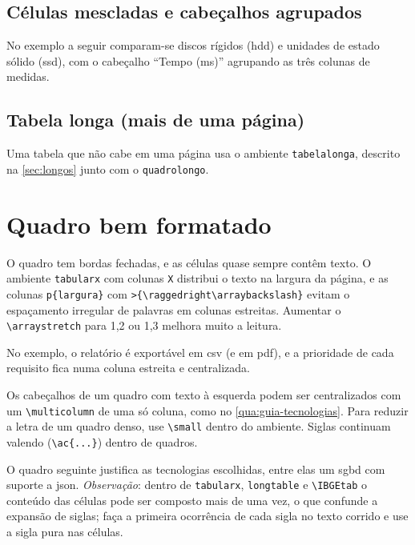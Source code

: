 \subsection{Células mescladas e cabeçalhos agrupados}

No exemplo a seguir comparam-se discos rígidos (\ac{hdd}) e unidades de estado sólido
(\ac{ssd}), com o cabeçalho ``Tempo (ms)'' agrupando as três colunas de medidas.


\subsection{Tabela longa (mais de uma página)}

Uma tabela que não cabe em uma página usa o ambiente \texttt{tabelalonga}, descrito na
\autoref{sec:longos} junto com o \texttt{quadrolongo}.

\section{Quadro bem formatado}

O quadro tem bordas fechadas, e as células quase sempre contêm texto. O ambiente
\texttt{tabularx} com colunas \texttt{X} distribui o texto na largura da página, e as
colunas \texttt{p\{largura\}} com
\texttt{>\{\textbackslash raggedright\textbackslash arraybackslash\}} evitam o
espaçamento irregular de palavras em colunas estreitas. Aumentar o
\texttt{\textbackslash arraystretch} para 1,2 ou 1,3 melhora muito a leitura.

No exemplo, o relatório é exportável em \ac{csv} (e em \ac{pdf}), e a prioridade de cada
requisito fica numa coluna estreita e centralizada.


Os cabeçalhos de um quadro com texto à esquerda podem ser centralizados com um
\texttt{\textbackslash multicolumn} de uma só coluna, como no \autoref{qua:guia-tecnologias}.
Para reduzir a letra de um quadro denso, use \texttt{\textbackslash small} dentro do
ambiente. Siglas continuam valendo (\texttt{\textbackslash ac\{...\}}) dentro de quadros.

O quadro seguinte justifica as tecnologias escolhidas, entre elas um \ac{sgbd} com suporte
a \ac{json}. \emph{Observação}: dentro de \texttt{tabularx}, \texttt{longtable} e
\texttt{\textbackslash IBGEtab} o conteúdo das células pode ser composto mais de uma vez,
o que confunde a expansão de siglas; faça a primeira ocorrência de cada sigla no texto
corrido e use a sigla pura nas células.

